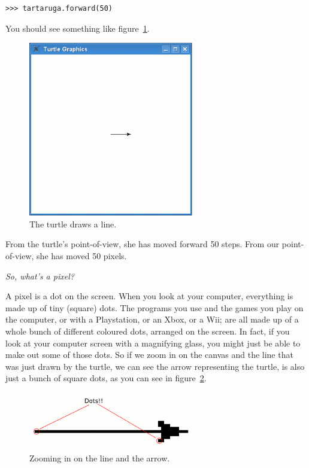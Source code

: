 \begin{listing}
\begin{verbatim}
>>> tartaruga.forward(50)
\end{verbatim}
\end{listing}

You should see something like figure~\ref{fig11}.

\begin{figure}
\begin{center}
\includegraphics[width=72mm]{eps/figure11.eps}
\end{center}
\caption{The turtle draws a line.}\label{fig11}
\end{figure}

From the turtle's point-of-view, she has moved forward 50 steps.  From our point-of-view, she has moved 50 pixels.

\noindent
\emph{So, what's a pixel?}

A pixel is a dot on the screen.  When you look at your computer, everything is made up of tiny (square) dots.  The programs you use and the games you play on the computer, or with a Playstation, or an Xbox, or a Wii; are all made up of a whole bunch of different coloured dots, arranged on the screen.  In fact, if you look at your computer screen with a magnifying glass, you might just be able to make out some of those dots. So if we zoom in on the canvas and the line that was just drawn by the turtle, we can see the arrow representing the turtle, is also just a bunch of square dots, as you can see in figure~\ref{fig12}.

\begin{figure}
\begin{center}
\includegraphics[width=72mm]{eps/figure12.eps}
\end{center}
\caption{Zooming in on the line and the arrow.}\label{fig12}
\end{figure}

